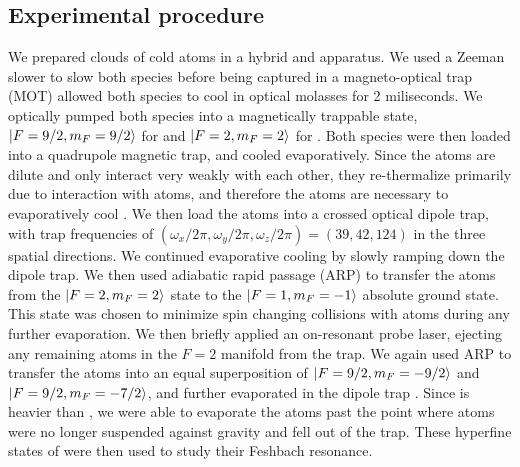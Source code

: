 \documentclass[12pt]{iopart}
\begin{document}
\subsection{Experimental procedure}
We prepared clouds of cold \K{} atoms in a hybrid \K{} and \Rb{} apparatus. We used a Zeeman slower to slow both species before being captured in a magneto-optical trap (MOT) allowed both species to cool in optical molasses for 2 miliseconds. We optically pumped both species into a magnetically trappable state, $\mathinner{|{F=9/2, m_F=9/2}\rangle}$ for \K{} and $\mathinner{|{F=2,m_F=2}\rangle}$ for \Rb{}. Both species were then loaded into a quadrupole magnetic trap, and cooled evaporatively. Since the \K{} atoms are dilute and only interact very weakly with each other, they re-thermalize primarily due to interaction with \Rb{} atoms, and therefore the \Rb{} atoms are necessary to evaporatively cool \K{}. We then load the atoms into a crossed optical dipole trap, with trap frequencies of $(\omega_x/2\pi,\omega_y/2\pi,\omega_z/2\pi) =(39, 42, 124)$ in the three spatial directions. We continued evaporative cooling by slowly ramping down the dipole trap. We then used adiabatic rapid passage (ARP) to transfer the \Rb{} atoms from the $\mathinner{|{F=2, m_F=2}\rangle}$ state to the  $\mathinner{|{F=1, m_F=-1}\rangle}$ absolute ground state. This state was chosen to minimize spin changing collisions with \K{} atoms during any further evaporation.  We then briefly applied an on-resonant probe laser, ejecting any remaining \Rb{} atoms in the $F=2$ manifold from the trap. We again used ARP to transfer the \K{} atoms into an equal superposition of $\mathinner{|{F=9/2,m_F=-9/2}\rangle}$ and $\mathinner{|{F=9/2,m_F=-7/2}\rangle}$, and further evaporated in the dipole trap \cite{DeMarco99}. Since \Rb{} is heavier than \K{}, we were able to evaporate the \K{} atoms past the point where \Rb{} atoms were no longer suspended against gravity and fell out of the trap.  These hyperfine states of \K{} were then used to study their Feshbach resonance. 
\end{document}
